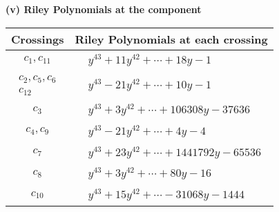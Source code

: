 \documentclass[1p]{elsarticle_modified}
\theoremstyle{definition}
\begin{document}
\newpage\renewcommand{\arraystretch}{1}
\flushleft \textbf{(v) Riley Polynomials at the component}\newline \\
\begin{tabular}{m{50pt}|m{274pt}}
Crossings & \hspace{64pt}Riley Polynomials at each crossing \\
\hline $$\begin{aligned}c_{1},c_{11}\end{aligned}$$&$\begin{aligned}
&y^{43}+11 y^{42}+\cdots+18 y-1
\end{aligned}$\\
\hline $$\begin{aligned}c_{2},c_{5},c_{6}\\c_{12}\end{aligned}$$&$\begin{aligned}
&y^{43}-21 y^{42}+\cdots+10 y-1
\end{aligned}$\\
\hline $$\begin{aligned}c_{3}\end{aligned}$$&$\begin{aligned}
&y^{43}+3 y^{42}+\cdots+106308 y-37636
\end{aligned}$\\
\hline $$\begin{aligned}c_{4},c_{9}\end{aligned}$$&$\begin{aligned}
&y^{43}-21 y^{42}+\cdots+4 y-4
\end{aligned}$\\
\hline $$\begin{aligned}c_{7}\end{aligned}$$&$\begin{aligned}
&y^{43}+23 y^{42}+\cdots+1441792 y-65536
\end{aligned}$\\
\hline $$\begin{aligned}c_{8}\end{aligned}$$&$\begin{aligned}
&y^{43}+3 y^{42}+\cdots+80 y-16
\end{aligned}$\\
\hline $$\begin{aligned}c_{10}\end{aligned}$$&$\begin{aligned}
&y^{43}+15 y^{42}+\cdots-31068 y-1444
\end{aligned}$\\
\hline
\end{tabular}\\~\\
\end{document}
